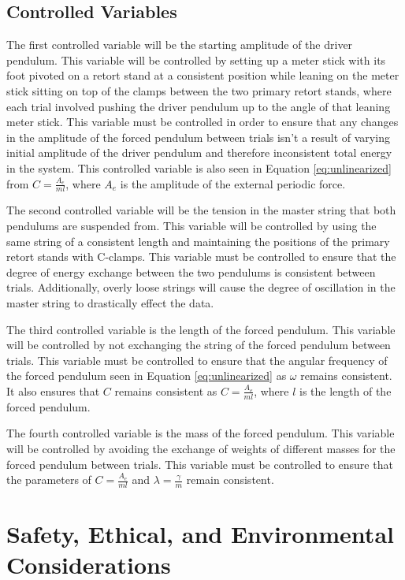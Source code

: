 \documentclass[letterpaper, 12pt]{article}
\begin{document}
\subsection{Controlled Variables}

The first controlled variable will be the starting amplitude of the
driver pendulum. This variable will be controlled by setting up a
meter stick with its foot pivoted on a retort stand at a
consistent position while leaning on the meter stick
sitting on top of the clamps between the two primary retort
stands, where each trial involved pushing the driver pendulum up to the
angle of that leaning meter stick. This variable must be controlled in
order to ensure that any changes in the amplitude of the forced
pendulum between trials isn't a result of varying
initial amplitude of the
driver pendulum and therefore inconsistent total energy in the system.
This controlled variable is also seen in Equation \ref*{eq:unlinearized}
from \(C = \frac{A_e}{ml}\), where \(A_e\) is the
amplitude of the external periodic force.

The second controlled variable will be the tension in the
master string that both pendulums are suspended from. This variable
will be controlled by using the same string of a consistent length
and maintaining the positions of the primary retort
stands with C-clamps. This variable must be controlled to
ensure that the degree of energy exchange between the
two pendulums is consistent between trials. Additionally,
overly loose strings will cause the degree of oscillation
in the master string to drastically effect the data.

The third controlled variable is the length of the
forced pendulum. This variable will be controlled by not
exchanging the string of the forced pendulum between trials.
This variable must be controlled to ensure that the
angular frequency of the forced pendulum seen
in Equation \ref*{eq:unlinearized} as \(\omega\)
remains consistent. It also ensures that \(C\)
remains consistent as \(C = \frac{A_e}{ml}\),
where \(l\) is the length of the forced pendulum.

The fourth controlled variable is the mass of
the forced pendulum. This variable will be controlled by
avoiding the exchange of weights of different
masses for the forced pendulum between trials.
This variable must be controlled to
ensure that the parameters of \(C = \frac{A_e}{ml}\)
and \(\lambda = \frac{\gamma}{m}\) remain consistent.

\section{Safety, Ethical, and Environmental Considerations}
\end{document}
